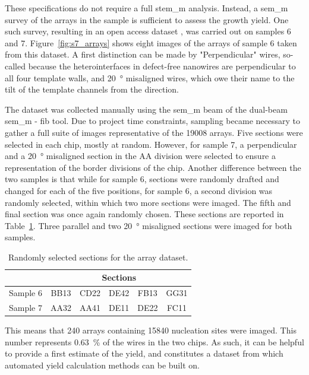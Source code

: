 These specifications do not require a full \acs{stem_m} analysis. Instead, a \acs{sem_m} survey of the arrays in the sample is sufficient to assess the growth yield. One such survey, resulting in an open access dataset \cite{dataset}, was carried out on samples 6 and 7. Figure~\ref{fig:s7_arrays} shows eight images of the arrays of sample 6 taken from this dataset. A first distinction can be made by "Perpendicular" wires, so-called because the heterointerfaces in defect-free nanowires are perpendicular to all four template walls, and \qty{20}{\degree} misaligned wires, which owe their name to the tilt of the template channels from the  direction.

The dataset was collected manually using the \acs{sem_m} beam of the dual-beam \acs{sem_m} - \acs{fib} tool. Due to project time constraints, sampling became necessary to gather a full suite of images representative of the \num{19008} arrays. Five sections were selected in each chip, mostly at random. However, for sample 7, a perpendicular and a \qty{20}{\degree} misaligned section in the AA division were selected to ensure a representation of the border divisions of the chip. Another difference between the two samples is that while for sample 6, sections were randomly drafted and changed for each of the five positions, for sample 6, a second division was randomly selected, within which two more sections were imaged. The fifth and final section was once again randomly chosen. These sections are reported in Table~\ref{tab:dataset_sections}. Three parallel and two \qty{20}{\degree} misaligned sections were imaged for both samples.

\begin{table}
    \centering
    \caption{Randomly selected sections for the array dataset.}
    \begin{tabular}{c|c c c c c}
         & \multicolumn{5}{c}{Sections} \\ \hline
        Sample 6 & BB13 & CD22 & DE42 & FB13 & GG31 \\
        Sample 7 & AA32 & AA41 & DE11 & DE22 & FC11 \\ \hline \hline
    \end{tabular}
    \label{tab:dataset_sections}
\end{table}

This means that 240 arrays containing 15840 nucleation sites were imaged. This number represents \qty{0.63}{\percent} of the wires in the two chips. As such, it can be helpful to provide a first estimate of the yield, and constitutes a dataset from which automated yield calculation methods can be built on.

